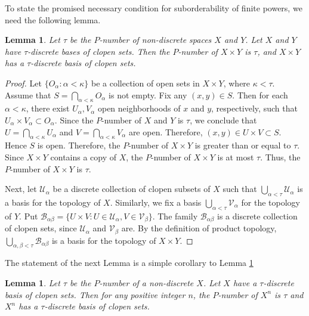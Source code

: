 \documentclass[12pt]{amsart}
\newtheorem{lem}[thm]{Lemma}
\begin{document}
\par\bigskip
To  state the promised necessary condition  for suborderability of finite powers, we need the following lemma.
\par\bigskip\noindent
\begin{lem}\label{lem:productivity1}
Let $\tau$ be the $P$-number of non-discrete spaces $X$ and $Y$. Let 
$X$ and $Y$  have  $\tau$-discrete bases of clopen sets.  Then the $P$-number of $X\times Y$ is $\tau$, and  $X\times Y$  has a $\tau$-discrete basis of clopen sets.
\end{lem}
\begin{proof}
Let $\{O_\alpha:\alpha<\kappa\}$ be a collection of open sets in $X\times Y$, where $\kappa<\tau$. Assume that 
$S=\bigcap_{\alpha<\kappa}O_\alpha$ is not empty. Fix any $(x,y)\in S$. Then for each $\alpha<\kappa$, there exist $U_\alpha,V_\alpha$ open neighborhoods of $x$ and $y$, respectively, such that $U_\alpha\times V_\alpha\subset O_\alpha$.
Since the $P$-number of $X$ and $Y$ is $\tau$, we conclude that $U=\bigcap_{\alpha<\kappa}U_\alpha$ and $V=\bigcap_{\alpha<\kappa}V_\alpha$ are open. Therefore, $(x,y)\in U\times V\subset S$. Hence $S$ is open. Therefore, the $P$-number of $X\times Y$ is greater than or equal to $\tau$. Since $X\times Y$ contains a copy of $X$, the $P$-number of $X\times Y$ is at most $\tau$. Thus, the $P$-number of $X\times Y$ is $\tau$.

Next, let $\mathcal U_\alpha$ be a discrete collection of clopen subsets of $X$ such that $\bigcup_{\alpha<\tau}\mathcal U_\alpha$ is a basis for the topology of $X$. Similarly, we fix a basis $\bigcup_{\alpha<\tau} \mathcal V_\alpha$ for the topology of $Y$.  Put $\mathcal B_{\alpha\beta} = \{U\times V: U\in \mathcal U_\alpha, V\in \mathcal V_\beta\}$. The family $\mathcal B_{\alpha\beta}$ is a discrete collection of clopen sets, since $\mathcal U_\alpha$ and $\mathcal V_\beta$ are. By the definition of  product topology, $\bigcup_{\alpha,\beta<\tau}\mathcal B_{\alpha\beta}$ is a basis for the topology of $X\times Y$.
\end{proof}
\par\bigskip\noindent
The statement of the next Lemma is a simple corollary to Lemma \ref{lem:productivity1}
\par\bigskip\noindent
\begin{lem}\label{lem:productivity}
Let $\tau$ be the $P$-number of a non-discrete $X$. Let 
$X$ have a $\tau$-discrete basis of clopen sets.  Then for any positive integer $n$, the $P$-number of $X^n$ is $\tau$ and  $X^n$  has a $\tau$-discrete basis of clopen sets.
\end{lem}
\end{document}
